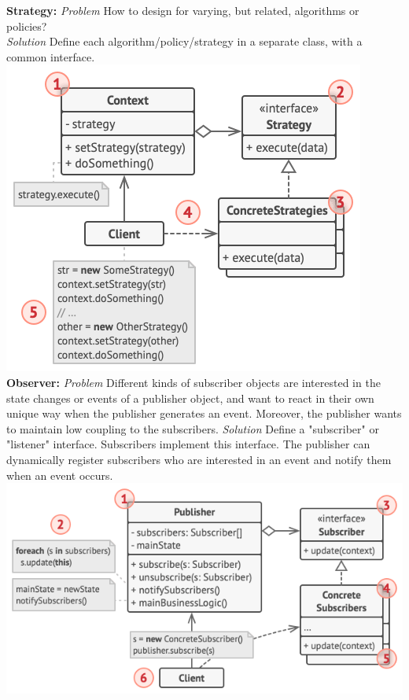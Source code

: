 \textbf{Strategy:} \textit{Problem} How to design for varying, but related, algorithms or policies?\\
\textit{Solution} Define each algorithm/policy/strategy in a separate class, with a common interface.\\
\includegraphics[width=\linewidth]{figs/strategy.png}\\
\textbf{Observer:} \textit{Problem} Different kinds of subscriber objects are interested in the state changes or events of a publisher object, and want to react in their own unique way when the publisher generates an event. Moreover, the publisher wants to maintain low coupling to the subscribers.
\textit{Solution} Define a "subscriber" or "listener" interface. Subscribers implement this interface. The publisher can dynamically register subscribers who are interested in an event and notify them when an event occurs.\\
\includegraphics[width=\linewidth]{figs/observer.png}\\
